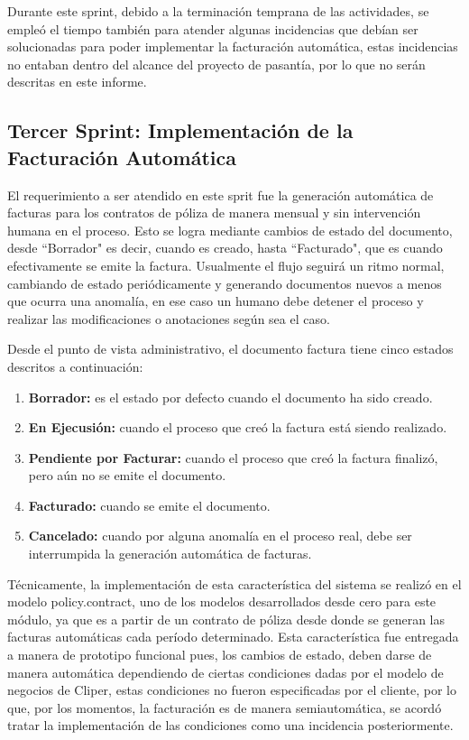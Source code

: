 \documentclass[a4paper, 12pt]{article}
\begin{document}
Durante este sprint, debido a la terminación temprana de las actividades, se empleó el tiempo también para atender algunas incidencias que debían ser solucionadas para poder implementar la facturación automática, estas incidencias no entaban dentro del alcance del proyecto de pasantía, por lo que no serán descritas en este informe.

\subsection{Tercer Sprint: Implementación de la Facturación Automática}
El requerimiento a ser atendido en este sprit fue la generación automática de facturas para los contratos de póliza de manera mensual y sin intervención humana en el proceso. Esto se logra mediante cambios de estado del documento, desde ``Borrador" es decir, cuando es creado, hasta ``Facturado", que es cuando efectivamente se emite la factura. Usualmente el flujo seguirá un ritmo normal, cambiando de estado periódicamente y generando documentos nuevos a menos que ocurra una anomalía, en ese caso un humano debe detener el proceso y realizar las modificaciones o anotaciones según sea el caso.

Desde el punto de vista administrativo, el documento factura tiene cinco estados descritos a continuación:
\begin{enumerate}
    \item \textbf{Borrador:} es el estado por defecto cuando el documento ha sido creado.
    \item \textbf{En Ejecusión:} cuando el proceso que creó la factura está siendo realizado.
    \item \textbf{Pendiente por Facturar:} cuando el proceso que creó la factura finalizó, pero aún no se emite el documento.
    \item \textbf{Facturado:} cuando se emite el documento.
    \item \textbf{Cancelado:} cuando por alguna anomalía en el proceso real, debe ser interrumpida la generación automática de facturas.
\end{enumerate}
Técnicamente, la implementación de esta característica del sistema se realizó en el modelo policy.contract, uno de los modelos desarrollados desde cero para este módulo, ya que es a partir de un contrato de póliza desde donde se generan las facturas automáticas cada período determinado. Esta característica fue entregada a manera de prototipo funcional pues, los cambios de estado, deben darse de manera automática dependiendo de ciertas condiciones dadas por el modelo de negocios de Cliper, estas condiciones no fueron especificadas por el cliente, por lo que, por los momentos, la facturación es de manera semiautomática, se acordó tratar la implementación de las condiciones como una incidencia posteriormente.
\end{document}
